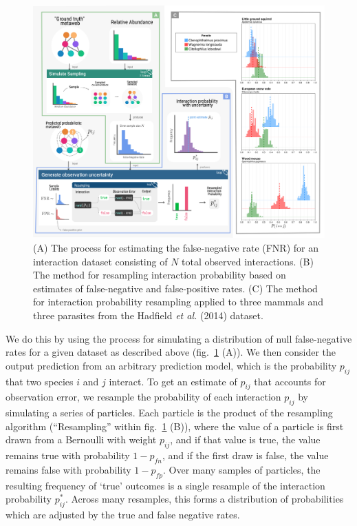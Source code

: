 \documentclass[10pt,oneside]{article}
\makeatletter
\def\maxwidth{\ifdim\Gin@nat@width>\linewidth\linewidth
\else\Gin@nat@width\fi}
\let\Oldincludegraphics\includegraphics
\renewcommand{\includegraphics}[1]{\Oldincludegraphics[width=\maxwidth]{#1}}
\makeatother
\begin{document}
\begin{figure}
\hypertarget{fig:resampling_concept}{%
\centering
\includegraphics{./figures/uncertainty_sampler.png}
\caption{(A) The process for estimating the false-negative rate (FNR)
for an interaction dataset consisting of \(N\) total observed
interactions. (B) The method for resampling interaction probability
based on estimates of false-negative and false-positive rates. (C) The
method for interaction probability resampling applied to three mammals
and three parasites from the Hadfield \emph{et al.} (2014)
dataset.}\label{fig:resampling_concept}
}
\end{figure}

We do this by using the process for simulating a distribution of null
false-negative rates for a given dataset as described above
(fig.~\ref{fig:resampling_concept} (A)). We then consider the output
prediction from an arbitrary prediction model, which is the probability
\(p_{ij}\) that two species \(i\) and \(j\) interact. To get an estimate
of \(p_{ij}\) that accounts for observation error, we resample the
probability of each interaction \(p_{ij}\) by simulating a series of
particles. Each particle is the product of the resampling algorithm
(``Resampling'' within fig.~\ref{fig:resampling_concept} (B)), where the
value of a particle is first drawn from a Bernoulli with weight
\(p_{ij}\), and if that value is true, the value remains true with
probability \(1-p_{fn}\), and if the first draw is false, the value
remains false with probability \(1-p_{fp}\). Over many samples of
particles, the resulting frequency of `true' outcomes is a single
resample of the interaction probability \(p_{ij}^*\). Across many
resamples, this forms a distribution of probabilities which are adjusted
by the true and false negative rates.
\end{document}
